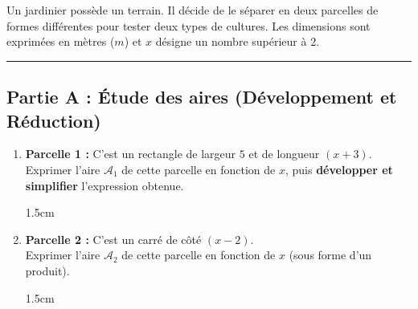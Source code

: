 \documentclass[a4paper]{book}
\begin{document}
    \begin{exemple}
        Un jardinier possède un terrain. Il décide de le séparer en deux parcelles de formes différentes pour tester deux types de cultures. Les dimensions sont exprimées en mètres ($m$) et $x$ désigne un nombre supérieur à 2.
        
        \begin{center}
        \end{center}
        
        \hrule
        \vspace{0.5cm}
        
        \subsection*{Partie A : Étude des aires (Développement et Réduction)}
        
        \begin{enumerate}[leftmargin=*]
            \item \textbf{Parcelle 1 :} C’est un rectangle de largeur $5$ et de longueur $(x + 3)$.\\
            Exprimer l'aire $\mathcal{A}_1$ de cette parcelle en fonction de $x$, puis \textbf{développer et simplifier} l'expression obtenue.

            \begin{ZoneReponse}{1.5cm}
            \end{ZoneReponse}
            
            \item \textbf{Parcelle 2 :} C’est un carré de côté $(x - 2)$.\\
            Exprimer l'aire $\mathcal{A}_2$ de cette parcelle en fonction de $x$ (sous forme d'un produit).

            \begin{ZoneReponse}{1.5cm}
            \end{ZoneReponse}


\end{enumerate}
\end{exemple}
\end{document}

